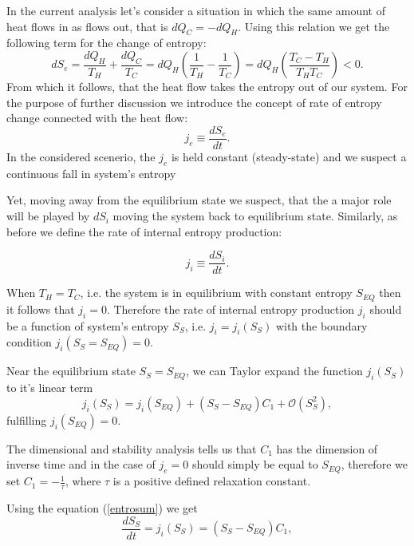 \documentclass[a4paper,12pt]{article}
\begin{document}
In the current analysis let's consider a situation in which the same amount of heat flows in as flows out, that is $dQ_C=-dQ_H$. Using this relation we get the following term for the change of entropy:
\begin{equation}
dS_e=\frac{dQ_H}{T_H}+\frac{dQ_C}{T_C}=dQ_H\left(\frac{1}{T_H}-\frac{1}{T_C}\right)
=dQ_H\left(\frac{T_C-T_H}{T_HT_C}\right)<0.
\label{dSe1}
\end{equation}
From which it follows, that the heat flow takes the entropy out of our system.
For the purpose of further discussion we introduce the concept of rate of entropy change connected with the heat flow:
\begin{equation}
j_e \equiv  \frac{dS_e}{dt}. 
\end{equation}
In the considered scenerio, the $j_e$ is held constant (steady-state) and we suspect a continuous fall in system's entropy

Yet, moving away from the equilibrium state we suspect, that the a major role will be played by $dS_i$ moving the system back to equilibrium state. Similarly, as before we define the rate of internal entropy production:

\begin{equation}
j_i \equiv \frac{dS_i}{dt}.   
\end{equation} 

When $T_H=T_C$, i.e. the system is in equilibrium with constant entropy $S_{EQ}$ then it follows that $j_i=0$.
Therefore the rate of internal entropy production $j_i$ should be a function  of system's entropy $S_S$, i.e. $j_i = j_i(S_S)$ with the boundary condition $j_i(S_S=S_{EQ})=0$. 

Near the equilibrium state $S_S=S_{EQ}$, we can Taylor expand the function $j_i(S_S)$ to it's linear term
\begin{equation}
j_i(S_S)=j_i\left(S_{EQ}\right)+\left(S_S-S_{EQ}\right)C_1+\mathcal{O}\left(S_S^2\right),
\end{equation} 
fulfilling $j_i\left(S_{EQ}\right)=0$. 

The dimensional and stability analysis tells us that $C_1$ has the dimension of inverse time and in the case of 
$j_e=0$ should simply be equal to $S_{EQ}$, therefore we set $C_1 = -\frac{1}{\tau}$, where $\tau$ is a positive defined relaxation constant.

Using the equation (\ref{entrosum}) we get
\begin{equation}
\frac{dS_S}{dt}=j_i\left(S_S\right)=\left(S_S-S_{EQ}\right)C_1, 
\label{stab}
\end{equation} 
\end{document}
